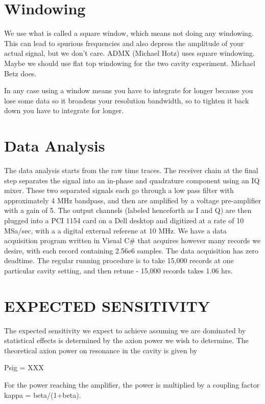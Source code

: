 \documentclass[11pt]{article}
\begin{document}
\section{Windowing}

We use what is called a square window, which means not doing any windowing. This can lead to spurious frequencies and also depress the amplitude of your actual signal, but we don't care.
ADMX (Michael Hotz) uses square windowing.
Maybe we should use flat top windowing for the two cavity experiment. Michael Betz does.

In any case using a window means you have to integrate for longer because you lose some data so it broadens your resolution bandwidth, so to tighten it back down you have to integrate for longer.

\section{Data Analysis}

The data analysis starts from the raw time traces. The receiver chain at the final step separates the signal into an in-phase and quadrature component using an IQ mixer. These two separated signals each go through a low pass filter with approximately 4 MHz bandpass, and then are amplified by a voltage pre-amplifier with a gain of 5. The output channels (labeled henceforth as I and Q) are then plugged into a PCI 1154 card on a Dell desktop and digitized at a rate of 10 MSa/sec, with a a digital external referene at 10 MHz. We have a data acquisition program written in Visual C$\#$ that acquires however many records we desire, with each record containing 2.56e6 samples. The data acquisition has zero deadtime. The regular running procedure is to take 15,000 records at one particular cavity setting, and then retune - 15,000 records takes 1.06 hrs. 

\section{EXPECTED SENSITIVITY}

The expected sensitivity we expect to achieve assuming we are dominated by statistical effects is determined by the axion power we wish to determine. The theoretical axion power on resonance in the cavity is given by 

Psig = XXX

For the power reaching the amplifier, the power is multiplied by a coupling factor kappa = beta/(1+beta).
\end{document}
